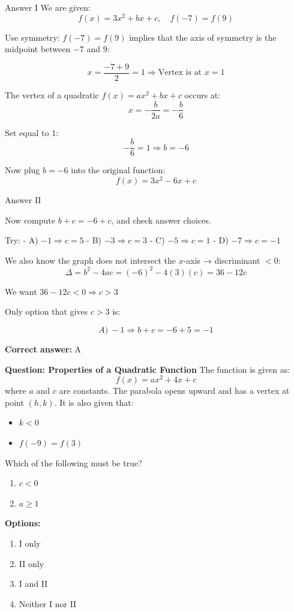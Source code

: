 \documentclass{beamer}
\begin{document}
\begin{frame}{Answer I}
We are given:
\[
f(x) = 3x^2 + bx + c, \quad f(-7) = f(9)
\]

Use symmetry: $f(-7) = f(9)$ implies that the axis of symmetry is the midpoint between $-7$ and $9$:

\[
x = \frac{-7 + 9}{2} = 1
\Rightarrow \text{Vertex is at } x = 1
\]

The vertex of a quadratic $f(x) = ax^2 + bx + c$ occurs at:
\[
x = -\frac{b}{2a} = -\frac{b}{6}
\]

Set equal to 1:
\[
-\frac{b}{6} = 1 \Rightarrow b = -6
\]

Now plug $b = -6$ into the original function:
\[
f(x) = 3x^2 - 6x + c
\]

\end{frame}
\begin{frame}{Answer II}

Now compute $b + c = -6 + c$, and check answer choices.

Try:
- A) $-1 \Rightarrow c = 5$
- B) $-3 \Rightarrow c = 3$
- C) $-5 \Rightarrow c = 1$
- D) $-7 \Rightarrow c = -1$

We also know the graph does not intersect the $x$-axis → discriminant $< 0$:
\[
\Delta = b^2 - 4ac = (-6)^2 - 4(3)(c) = 36 - 12c
\]

We want $36 - 12c < 0 \Rightarrow c > 3$

Only option that gives $c > 3$ is:

\[
\boxed{A) \ -1 \Rightarrow b + c = -6 + 5 = -1}
\]

\textbf{Correct answer:} A
\end{frame}



\begin{frame}{\textbf{Question: Properties of a Quadratic Function}}
The function is given as:
\[
f(x) = ax^2 + 4x + c
\]
where \(a\) and \(c\) are constants. The parabola opens upward and has a vertex at point \((h, k)\). It is also given that:
\begin{itemize}
    \item \(k < 0\)
    \item \(f(-9) = f(3)\)
\end{itemize}

Which of the following must be true?

\begin{enumerate}
    \item[\textbf{I.}] \(c < 0\)
    \item[\textbf{II.}] \(a \geq 1\)
\end{enumerate}

\vspace{0.1cm}
\textbf{Options:}
\begin{enumerate}
    \item[A]  I only
    \item[B] II only
    \item[C] I and II
    \item[D] Neither I nor II
\end{enumerate}
\end{frame}
\end{document}
